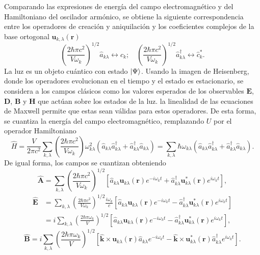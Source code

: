 Comparando las expresiones de energía del campo electromagnético y del Hamiltoniano del oscilador armónico, se obtiene la siguiente correspondencia entre los operadores de creación y aniquilación y los coeficientes complejos de la base ortogonal $\mathbf{u}_{k,\lambda}(\mathbf{r})$ \cite{Loudon}
\begin{equation}
  \left( \frac{2\hbar \pi c^2}{V\omega_k} \right)^{1/2} \hat{a}_{k\lambda} \leftrightarrow \hat{c}_{k}; \quad \left( \frac{2\hbar \pi c^2}{V\omega_k} \right)^{1/2} \hat{a}^{\dagger}_{k\lambda} \leftrightarrow \hat{c}_{k}^*.
\end{equation}
La luz es un objeto cuántico con estado $\ket{\Psi}$. Usando la imagen de Heisenberg, donde los operadores evolucionan en el tiempo y el estado es estacionario, se considera a los campos clásicos como los valores esperados de los observables $\mathbf{E}$, $\mathbf{D}$, $\mathbf{B}$ y $\mathbf{H}$ que actúan sobre los estados de la luz. la linealidad de las ecuaciones de Maxwell  permite que estas sean válidas para estos operadores. \cite{Leonhardt} De esta forma, se cuantiza la energía del campo electromagnético, remplazando $U$ por el operador Hamiltoniano
\begin{equation}
  \hat{H}  =  \frac{V}{2\pi c^2}\sum_{k,\lambda} \left( \frac{2\hbar \pi c^2}{V\omega_k} \right) \omega_{k\lambda}^2 \left( \hat{a}_{k\lambda} \hat{a}^{\dagger}_{k\lambda} + \hat{a}^{\dagger}_{k\lambda} \hat{a}_{k\lambda} \right) = \sum_{k,\lambda} \hbar \omega_{k\lambda} \left( \hat{a}_{k\lambda} \hat{a}^{\dagger}_{k\lambda} + \hat{a}^{\dagger}_{k\lambda} \hat{a}_{k\lambda} \right).
\end{equation}
De igual forma, los campos se cuantizan obteniendo \cite{Agarwal_2012}
\begin{equation}
  \hat{\mathbf{A}} =  \sum_{k,\lambda} \left( \frac{2\hbar \pi c^2}{V\omega_k} \right)^{1/2} \left[ \hat{a}_{k\lambda} \mathbf{u}_{k\lambda} (\mathbf{r})e^{-i\omega_k t} + \hat{a}^{\dagger}_{k\lambda} \mathbf{u}_{k\lambda}^* (\mathbf{r})e^{i\omega_{k} t} \right],
\end{equation}
\begin{align}
  \hat{\mathbf{E}} & = \sum_{k,\lambda} \left( \frac{2\hbar \pi c^2}{V\omega_k} \right)^{1/2} \frac{i\omega_{k}}{c} \left[ \hat{a}_{k\lambda} \mathbf{u}_{k\lambda} (\mathbf{r})e^{-i\omega_k t} -  \hat{a}^{\dagger}_{k\lambda} \mathbf{u}_{k\lambda}^* (\mathbf{r})e^{i\omega_{k} t} \right] \nonumber \\
                   & = i \sum_{k,\lambda} \left( \frac{2\hbar \pi \omega_k}{V} \right)^{1/2} \left[ \hat{a}_{k\lambda} \mathbf{u}_{k\lambda} (\mathbf{r})e^{-i\omega_k t} -  \hat{a}^{\dagger}_{k\lambda} \mathbf{u}_{k\lambda}^* (\mathbf{r})e^{i\omega_{k} t} \right],
\end{align}
\begin{equation}
  \hat{\mathbf{B}} = i \sum_{k,\lambda} \left( \frac{2\hbar \pi \omega_k}{V} \right)^{1/2} \left[ \mathbf{\hat{k}} \times \mathbf{u}_{k\lambda}(\mathbf{r}) \hat{a}_{k\lambda} e^{-i\omega_k t} - \mathbf{\hat{k}} \times \mathbf{u}_{k\lambda}^* (\mathbf{r}) \hat{a}^{\dagger}_{k\lambda} e^{i\omega_{k} t} \right].
\end{equation}